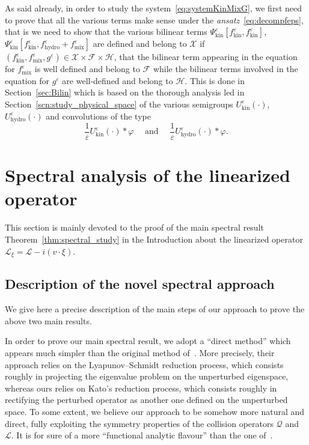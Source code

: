 \documentclass[10pt]{amsart}
\theoremstyle{definition}\newtheorem{defi}[theo]{Definition}\newtheorem{rema}[theo]{Remark}\newtheorem{exam}[theo]{Example}\newtheorem{exem}[theo]{Example}\newtheorem{nota}[theo]{Notation}
\newcommand{\hyd}{\mathrm{hydro}}
\newcommand{\mix}{\mathrm{mix}}
\newcommand{\kin}{\mathrm{kin}}
\newcommand{\LL}{\mathcal{L}}
\newcommand{\QQ}{\mathcal{Q}}
\newcommand{\FFF}{\mathscr{F}}
\newcommand{\HHH}{\mathscr{H}}
\newcommand{\GGG}{\mathscr{X}}
\newcommand{\SSSs}{\HHH}
\newcommand{\SSSl}{\GGG}
\newcommand{\SSSm}{\FFF}
\newcommand*\eps{{\varepsilon}}
\begin{document}
As said already, in order to study the system~\eqref{eq:systemKinMixG}, we first need to prove that all the various terms make sense under the \emph{ansatz}~\eqref{eq:decompfeps}, that is we need to show that the various bilinear terms $\Psi^\eps_\kin [f^\eps_\kin, f^\eps_\kin]$, $\Psi^\eps_\kin[f^\eps_\kin, f^\eps_\hyd + f^\eps_\mix]$ are defined and belong to $\SSSl$ if $(f^\eps_\kin, f^\eps_\mix, g^\eps) \in \SSSl \times \SSSm \times \SSSs$, that the bilinear term appearing in the equation for $f_\mix^\eps$ is well defined and belong to $\SSSm$ while the bilinear terms involved in the equation for $g^\eps$ are well-defined and belong to $\SSSs.$ This is done in Section~\ref{sec:Bilin} which is based on the thorough analysis led in Section~\ref{scn:study_physical_space} of the various semigroups $U^\eps_\kin(\cdot)$, $U^\eps_\hyd(\cdot)$ and convolutions of the type
\[
\frac{1}{\eps} U^\eps_\kin(\cdot) \ast \varphi \quad \text{ and } \quad \frac{1}{\eps}U^\eps_\hyd(\cdot) \ast \varphi.
\]

\section{Spectral analysis of the linearized operator}\label{scn:spectral_study}

This section is mainly devoted to the proof of the main spectral result Theorem~\ref{thm:spectral_study} in the Introduction about the linearized operator $\LL_{\xi} = \LL - i (v \cdot \xi).$

\subsection{Description of the novel spectral approach} \label{sec:newspec}
We give here a precise description of the main steps of our approach to prove the above two main results.

{ In order to prove our main spectral result, we adopt a ``direct method'' which appears much simpler than the original method of~\cite{EP1975}. More precisely, their approach relies on the Lyapunov--Schmidt reduction process, which consists roughly in projecting the eigenvalue problem on the unperturbed eigenspace, whereas ours relies on Kato's reduction process, which consists roughly in rectifying the perturbed operator as another one defined on the unperturbed space. To some extent, we believe our approach to be somehow more natural and direct, fully exploiting the symmetry properties of the collision operators $\QQ$ and $\LL$. It is for sure of a more ``functional analytic flavour'' than the one of~\cite{EP1975}.}
\end{document}
